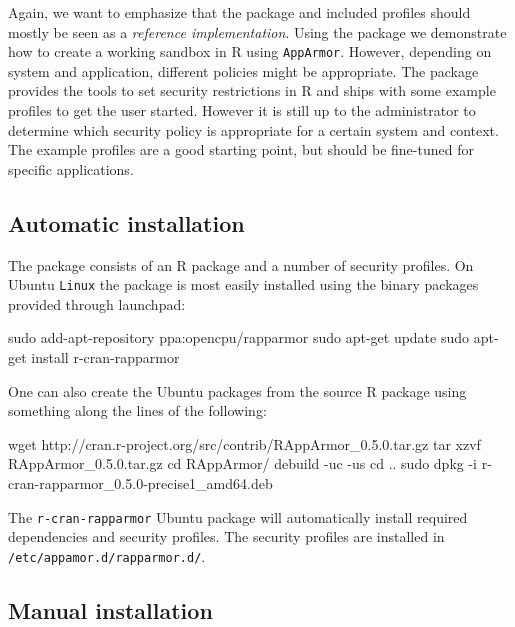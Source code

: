 \documentclass[article]{jss}
\newcommand{\R}{\textsf{R}\xspace}
\newcommand{\AppArmor}{\texttt{AppArmor}\xspace}
\newcommand{\RAppArmor}{\pkg{RAppArmor}\xspace}
\newcommand{\Linux}{\texttt{Linux}\xspace}
\begin{document}
Again, we want to emphasize that the package and included profiles should mostly
be seen as a \emph{reference implementation}. Using the package we demonstrate
how to create a working sandbox in \R using \AppArmor. However, depending on
system and application, different policies might be appropriate. The \RAppArmor
package provides the tools to set security restrictions in \R and ships with
some example profiles to get the user started. However it is still up to the
administrator to determine which security policy is appropriate for a certain
system and context. The example profiles are a good starting point, but should
be fine-tuned for specific applications.

\subsection{Automatic installation}

The \RAppArmor package consists of an \R package and a number of security
profiles. On Ubuntu \Linux the package is most easily installed using the binary
packages provided through launchpad:

\begin{CodeChunk}
\begin{CodeInput}
sudo add-apt-repository ppa:opencpu/rapparmor
sudo apt-get update
sudo apt-get install r-cran-rapparmor
\end{CodeInput}
\end{CodeChunk}

One can also create the Ubuntu packages from the source \R package
using something along the lines of the following:

\begin{CodeChunk}
\begin{CodeInput}
wget http://cran.r-project.org/src/contrib/RAppArmor_0.5.0.tar.gz
tar xzvf RAppArmor_0.5.0.tar.gz
cd RAppArmor/
debuild -uc -us
cd ..
sudo dpkg -i r-cran-rapparmor_0.5.0-precise1_amd64.deb
\end{CodeInput}
\end{CodeChunk}

The \texttt{r-cran-rapparmor} Ubuntu package will automatically install required
dependencies and security profiles. The security profiles are installed in
\texttt{/etc/appamor.d/rapparmor.d/}.

\subsection{Manual installation}
\end{document}

